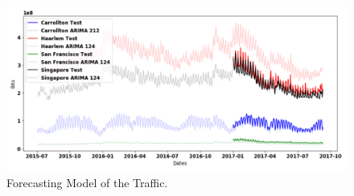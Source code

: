 \begin{figure}[!h]
  \centering
  \includegraphics[scale=0.25]{img/_arima.png}
  \caption[ARIMA for BEM]{Forecasting Model of the Traffic.}
  \label{fig:arima_bem}
  \end{figure}